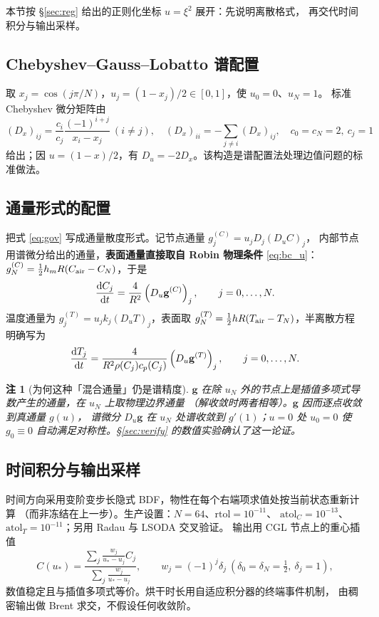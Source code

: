 \documentclass[bwprint]{cumcmthesis}
\newtheorem{remark}{注}
\begin{document}
本节按 \S\ref{sec:reg} 给出的正则化坐标 $u=\xi^2$ 展开：先说明离散格式，
再交代时间积分与输出采样。

\subsection{Chebyshev--Gauss--Lobatto 谱配置}

取 $x_j=\cos(j\pi/N)$，$u_j=(1-x_j)/2\in[0,1]$，使 $u_0=0$、$u_N=1$。
标准 Chebyshev 微分矩阵由
\[
(D_x)_{ij}=\frac{c_i}{c_j}\frac{(-1)^{i+j}}{x_i-x_j}\ (i\ne j),\quad
(D_x)_{ii}=-\sum_{j\ne i}(D_x)_{ij},\quad
c_0=c_N=2,\ c_j=1
\]
给出；因 $u=(1-x)/2$，有 $D_u=-2D_x$。该构造是谱配置法处理边值问题的标准做法\cite{trefethen}。

\subsection{通量形式的配置}

把式 \eqref{eq:gov} 写成通量散度形式。记节点通量 $g_j^{(C)}=u_jD_j(D_uC)_j$，
内部节点用谱微分给出的通量，\textbf{表面通量直接取自 Robin 物理条件} \eqref{eq:bc_u}：
$g_N^{(C)}=\frac12h_mR(C_{\rm air}-C_N)$，于是
\begin{equation}
\frac{{\rm d}C_j}{{\rm d}t}=\frac{4}{R^2}\left(D_u\mathbf{g}^{(C)}\right)_j,
\qquad j=0,\dots,N.
\end{equation}
温度通量为 $g_j^{(T)}=u_jk_j(D_uT)_j$，表面取
$g_N^{(T)}=\frac12hR(T_{\rm air}-T_N)$，半离散方程明确写为
\begin{equation}
\frac{{\rm d}T_j}{{\rm d}t}
=\frac{4}{R^2\rho(C_j)c_p(C_j)}
\left(D_u\mathbf{g}^{(T)}\right)_j,
\qquad j=0,\dots,N.
\end{equation}

\begin{remark}[为何这种「混合通量」仍是谱精度]
$\mathbf g$ 在除 $u_N$ 外的节点上是插值多项式导数产生的通量，在 $u_N$ 上取物理边界通量
（解收敛时两者相等）。$\mathbf g$ 因而逐点收敛到真通量 $g(u)$，
谱微分 $D_u\mathbf g$ 在 $u_N$ 处谱收敛到 $g'(1)$；$u=0$ 处 $u_0=0$ 使 $g_0\equiv0$
自动满足对称性。\S\ref{sec:verify} 的数值实验确认了这一论证。
\end{remark}

\subsection{时间积分与输出采样}

时间方向采用变阶变步长隐式 BDF，物性在每个右端项求值处按当前状态重新计算
（而非冻结在上一步）。生产设置：$N=64$、$\mathrm{rtol}=10^{-11}$、
$\mathrm{atol}_C=10^{-13}$、$\mathrm{atol}_T=10^{-11}$；另用 Radau 与 LSODA 交叉验证。
输出用 CGL 节点上的重心插值
\[
C(u_*)=\frac{\sum_j\frac{w_j}{u_*-u_j}C_j}{\sum_j\frac{w_j}{u_*-u_j}},
\qquad w_j=(-1)^j\delta_j\ (\delta_0=\delta_N=\tfrac12,\ \delta_j=1),
\]
数值稳定且与插值多项式等价\cite{berrut}。烘干时长用自适应积分器的终端事件机制，
由稠密输出做 Brent 求交，不假设任何收敛阶。
\end{document}
